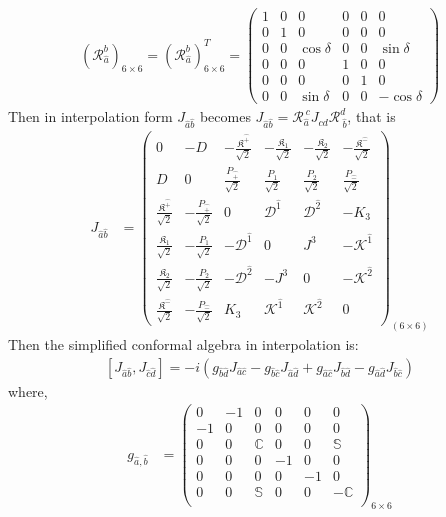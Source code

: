 \documentclass[%
 reprint,
superscriptaddress,
 amsmath,amssymb,
 aps,
]{revtex4-2}
\newcommand{\itP}[1]{\hat{#1}}
\begin{document}
\begin{align}
    (\mathcal{R}_{\hat{a}}^{b})_{6\times6}=(\mathcal{R}_{\hat{a}}^{b})^T_{6\times6}=\begin{pmatrix}
    1&0&0&0&0&0\\
    0&1&0&0&0&0\\
    0&0&\cos{\delta}&0&0&\sin{\delta}\\
    0&0&0&1&0&0\\
    0&0&0&0&1&0\\
    0&0&\sin{\delta}&0&0&-\cos{\delta}
    \end{pmatrix}
\end{align}
Then in interpolation form $J_{\hat{a}\hat{b}}$ becomes $J_{\hat{a}\hat{b}}=\mathcal{R}_{\hat{a}}^{~{c}}J_{cd}\mathcal{R}_{~\hat{b}}^{{d}}$, that is
\begin{align}
    J_{\hat{a}\hat{b}}&=\begin{pmatrix}
    0&-D&-\frac{\mathfrak{K}^{\hat{+}}}{\sqrt{2}}&-\frac{\mathfrak{K}_1}{\sqrt{2}}&-\frac{\mathfrak{K}_2}{\sqrt{2}}&-\frac{\mathfrak{K}^{\hat{-}}}{\sqrt{2}}\\
    D&0&\frac{P_{\hat{+}}}{\sqrt{2}}&\frac{P_{1}}{\sqrt{2}}&\frac{P_{2}}{\sqrt{2}}&\frac{P_{\hat{-}}}{\sqrt{2}}\\
    \frac{\mathfrak{K}^{\hat{+}}}{\sqrt{2}}&-\frac{P_{\hat{+}}}{\sqrt{2}}&0 & {\mathcal{D}}^{\itP{1}} & {\mathcal{D}}^{\itP{2}} & -K_3\\
    \frac{\mathfrak{K}_1}{\sqrt{2}}&-\frac{P_{1}}{\sqrt{2}}&-{\mathcal{D}}^{\itP{1}} & 0 & {J}^{3} & -{\mathcal{K}}^{\itP{1}}\\
    \frac{\mathfrak{K}_2}{\sqrt{2}}&-\frac{P_{2}}{\sqrt{2}}&-{\mathcal{D}}^{\itP{2}} & -{J}^{3} & 0 & -{\mathcal{K}}^{\itP{2}}\\
    \frac{\mathfrak{K}^{\hat{-}}}{\sqrt{2}}&-\frac{P_{\hat{-}}}{\sqrt{2}}&K_3 & {\mathcal{K}}^{\itP{1}} & {\mathcal{K}}^{\itP{2}} & 0
  \end{pmatrix}_{(6\times6)}\label{Jhat+hat-}
\end{align}
Then the simplified conformal algebra in interpolation is:
  \begin{align}
      \left[J_{{\hat{a}}{\hat{b}}},J_{{\hat{c}}{\hat{d}}}\right]=-i\left(g_{{\hat{b}}{\hat{d}}}J_{{\hat{a}}{\hat{c}}}-g_{{\hat{b}}{\hat{c}}}J_{{\hat{a}}{\hat{d}}}+g_{{\hat{a}}{\hat{c}}}J_{{\hat{b}}{\hat{d}}}-g_{{\hat{a}}{\hat{d}}}J_{{\hat{b}}{\hat{c}}}\right)\label{simplesrint}
  \end{align}
where, 
\begin{align}
    g_{\hat{a},\hat{b}}&=\begin{pmatrix}
  0&-1&0&0&0&0\\
  -1&0&0&0&0&0\\
  0&0&\mathbb{C}&0&0&\mathbb{S}\\
  0&0&0&-1&0&0\\
  0&0&0&0&-1&0\\
  0&0&\mathbb{S}&0&0&-\mathbb{C}\\
  \end{pmatrix}_{6\times6}\label{metricghat}
\end{align}
\end{document}
